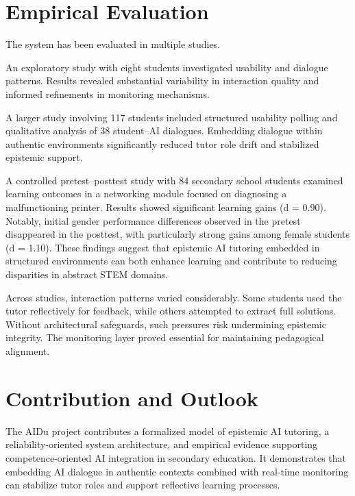 \documentclass[10pt,twocolumn]{article}
\begin{document}
\section{Empirical Evaluation}\label{empirical-evaluation}

The system has been evaluated in multiple studies.

An exploratory study with eight students investigated usability and
dialogue patterns. Results revealed substantial variability in
interaction quality and informed refinements in monitoring mechanisms.

A larger study involving 117 students included structured usability
polling \citep{BuchnerSpahnEyer2026AIDuSGFB}
\citep{Langenegger2025LernenDurchKI} and qualitative analysis of 38
student--AI dialogues. Embedding dialogue within authentic environments
significantly reduced tutor role drift and stabilized epistemic support.

A controlled pretest--posttest study with 84 secondary school students
examined learning outcomes in a networking module focused on diagnosing
a malfunctioning printer. Results showed significant learning gains (d =
0.90). Notably, initial gender performance differences observed in the
pretest disappeared in the posttest, with particularly strong gains
among female students (d = 1.10). These findings suggest that epistemic
AI tutoring embedded in structured environments can both enhance
learning and contribute to reducing disparities in abstract STEM
domains.

Across studies, interaction patterns varied considerably. Some students
used the tutor reflectively for feedback, while others attempted to
extract full solutions. Without architectural safeguards, such pressures
risk undermining epistemic integrity. The monitoring layer proved
essential for maintaining pedagogical alignment.

\section{Contribution and Outlook}\label{contribution-and-outlook}

The AIDu project contributes a formalized model of epistemic AI
tutoring, a reliability-oriented system architecture, and empirical
evidence supporting competence-oriented AI integration in secondary
education. It demonstrates that embedding AI dialogue in authentic
contexts combined with real-time monitoring can stabilize tutor roles
and support reflective learning processes.
\end{document}
